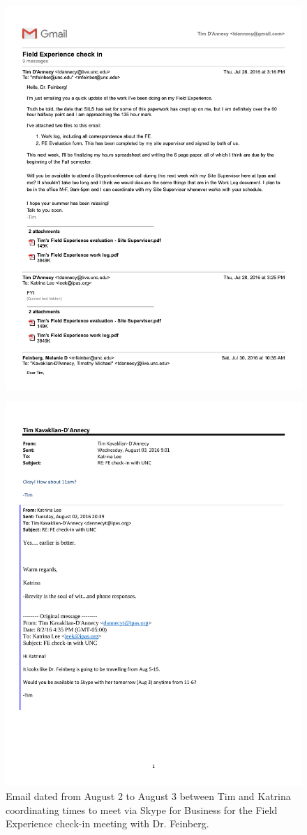 \begin{figure}
  \centering
        \noindent\includegraphics[page=3,angle=-90,origin=c,width=.75\textwidth,height=.75\textheight]{documents/2016-08-03-Email-Tim-Melanie}
\end{figure}

\begin{figure}
  \centering
        \noindent\includegraphics[page=1,angle=-90,origin=c,width=.75\textwidth,height=.75\textheight]{documents/2016-08-03-Email-Tim-Katrina}
 \caption{Email dated from August 2 to August 3 between Tim and Katrina coordinating times to meet via Skype for Business for the Field Experience check-in meeting with Dr. Feinberg.}
 \label{fig:2016-08-03-Email-Tim-Katrina}
\end{figure}

